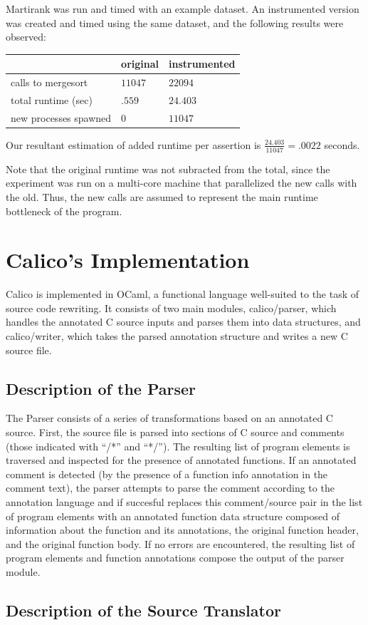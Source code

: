 \documentclass[notitlepage]{article}
\begin{document}
Martirank was run and timed with an example dataset. An instrumented version was created and timed using the same dataset, and the following results were observed:

\begin{tabular}{l | l | l}
& original & instrumented \\ \hline
calls to mergesort & $11047$ & $22094$ \\
total runtime (sec) & $.559$ & $24.403$ \\
new processes spawned & 0 & $11047$
\end{tabular}

Our resultant estimation of added runtime per assertion is $\frac{24.403}{11047} = {\mathbf .0022}$ seconds.

Note that the original runtime was not subracted from the total, since the experiment was run on a multi-core machine that parallelized the new calls with the old. Thus, the new calls are assumed to represent the main runtime bottleneck of the program.

\section{Calico's Implementation}

Calico is implemented in OCaml, a functional language well-suited to the task of source code rewriting. It consists of two main modules, calico/parser, which handles the annotated C source inputs and parses them into data structures, and calico/writer, which takes the parsed annotation structure and writes a new C source file.

\subsection{Description of the Parser}

The Parser consists of a series of transformations based on an annotated C source. First, the source file is parsed into sections of C source and comments (those indicated with ``/*'' and ``*/''). The resulting list of program elements is traversed and inspected for the presence of annotated functions. If an annotated comment is detected (by the presence of a function info annotation in the comment text), the parser attempts to parse the comment according to the annotation language and if succesful replaces this comment/source pair in the list of program elements with an annotated function data structure composed of information about the function and its annotations, the original function header, and the original function body. If no errors are encountered, the resulting list of program elements and function annotations compose the output of the parser module.

\subsection{Description of the Source Translator}
\end{document}
